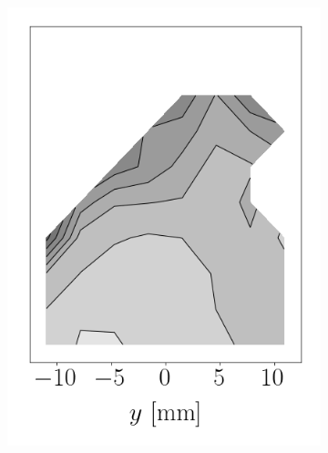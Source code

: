 \begin{figure}[h!]
\begin{subfigure}[b]{0.2\textwidth}
   \includegraphics[scale=0.4]{./part2_developments/figures_ch6_lagrangian_JICF/params_gaseous_initial_conditions/maps/ALM_FDC_0p10_SMD}
\end{subfigure}
\hspace*{0.00in}
\begin{subfigure}[b]{0.2\textwidth}
	\flushleft

\end{subfigure}
\end{figure}
